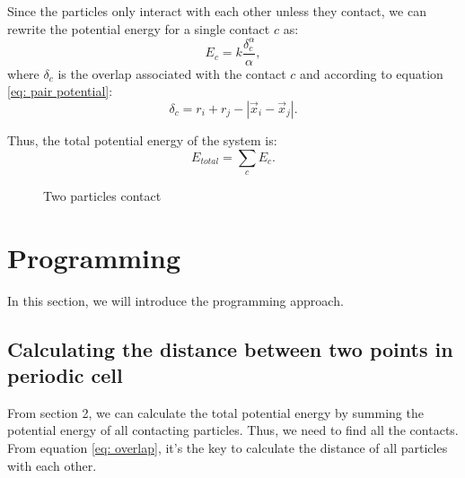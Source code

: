 \documentclass[a4paper]{article}
\begin{document}
Since the particles only interact with each other unless they contact, we can rewrite the potential energy for a single contact $c$ as:
\begin{equation}
E_c = k\frac{\delta_c^{\alpha}}{\alpha},
\end{equation}
where $\delta_c$ is the overlap associated with the contact $c$ and according to equation \eqref{eq: pair potential}:
\begin{equation}\label{eq: overlap}
\delta_c = r_i + r_j - \left|\vec{x}_i-\vec{x}_j\right|.
\end{equation}

Thus, the total potential energy of the system is:
\begin{equation}\label{eq: total potential2}
     E_{total} = \sum_{c}E_{c}.
\end{equation}

\begin{figure}[!htbp]
\begin{center}
\end{center}
\caption{Two particles contact}
\end{figure}

\section{Programming}
In this section, we will introduce the programming approach.
\subsection{Calculating the distance between two points in periodic cell}
From section 2, we can calculate the total potential energy by summing the potential energy of all contacting particles. Thus, we need to find all the contacts. From equation \eqref{eq: overlap}, it's the key to calculate the distance of all particles with each other.
\end{document}
